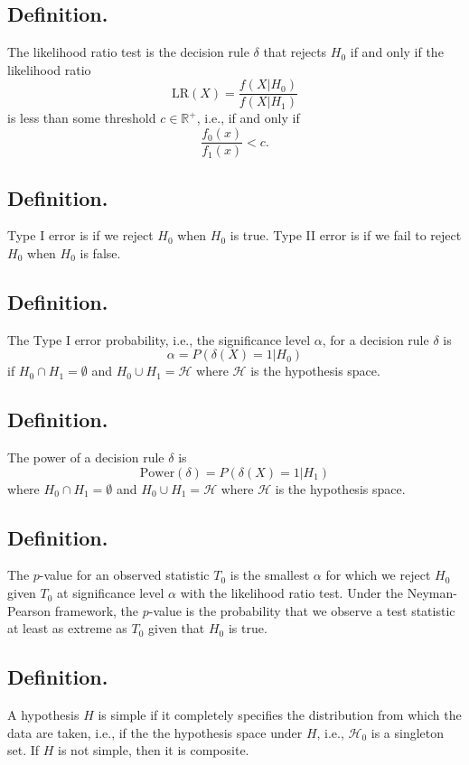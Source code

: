 \documentclass[titlepage]{article}
\begin{document}
\subsection{Definition.} The likelihood ratio test is the decision rule $\delta$ that rejects $H_{0}$ if and only if the likelihood ratio 
$$\text{LR}(X) = \frac{f(X|H_{0})}{f(X|H_{1})}$$
is less than some threshold $c \in \mathbb{R}^{+}$, i.e., if and only if 
$$\frac{f_{0}(x)}{f_{1}(x)} < c.$$

\subsection{Definition.} Type I error is if we reject $H_{0}$ when $H_{0}$ is true. Type II error is if we fail to reject $H_{0}$ when $H_{0}$ is false.

\subsection{Definition.} The Type I error probability, i.e., the significance level $\alpha$, for a decision rule $\delta$ is 
$$\alpha = P(\delta(X)=1|H_{0})$$
if $H_{0} \cap H_{1} = \emptyset$ and $H_{0} \cup H_{1} = \mathcal{H}$ where $\mathcal{H}$ is the hypothesis space.

\subsection{Definition.} The power of a decision rule $\delta$ is 
$$\text{Power}(\delta) = P(\delta(X)=1|H_{1})$$
where $H_{0} \cap H_{1} = \emptyset$ and $H_{0} \cup H_{1} = \mathcal{H}$ where $\mathcal{H}$ is the hypothesis space.

\subsection{Definition.} The $p$-value for an observed statistic $T_{0}$ is the smallest $\alpha$ for which we reject $H_{0}$ given $T_{0}$ at significance level $\alpha$ with the likelihood ratio test. Under the Neyman-Pearson framework, the $p$-value is the probability that we observe a test statistic at least as extreme as $T_{0}$ given that $H_{0}$ is true.

\subsection{Definition.} A hypothesis $H$ is simple if it completely specifies the distribution from which the data are taken, i.e., if the the hypothesis space under $H$, i.e., $\mathcal{H}_{0}$ is a singleton set. If $H$ is not simple, then it is composite.
\end{document}
